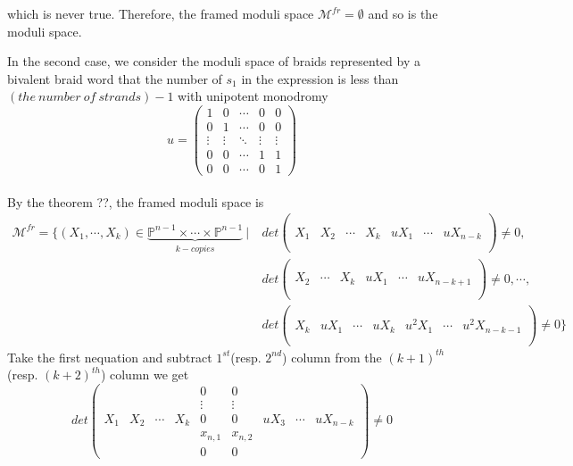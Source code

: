 \begin{example}
which is never true. Therefore, the framed moduli  space $\mathcal{M}^{fr}=\emptyset$ and so is the moduli space.\\
\bigskip

In the second case, we consider the moduli space of braids represented by a bivalent braid word that the number of  $s_1$ in the expression is less than $(the~number~of~strands)-1$ with unipotent monodromy 
\[u= 
\begin{pmatrix}
	1&0&\cdots&0&0\\
	0&1&\cdots&0&0\\
	\vdots&\vdots&\ddots&\vdots&\vdots\\
	0&0&\cdots&1&1\\
	0&0&\cdots&0&1
\end{pmatrix}
\] \\
By the theorem ??, the framed moduli space is 
		\begin{align*}
		\mathcal{M}^{fr}=
		\{(X_1,\cdots,X_{k}) \in 										\underbrace{\mathbb{P}^{n-1}\times \cdots \times \mathbb{P}			^{n-1}}_{k-copies}~|~		
		& det
		\left( \begin{array}{c|c|c|c|c|c|c}
			& & & & & &\\
			& & & & & &\\
			X_1&X_2&\cdots&X_{k}&uX_1&\cdots& uX_{n-k}\\
			& & & & & &\\
			& & & & & &
		\end{array}\right)
		\neq 0, \\
		& det
		\left( \begin{array}{c|c|c|c|c|c}
			& & & & &\\
			& & & & &\\
			X_2&\cdots&X_{k}&uX_1&\cdots& uX_{n-k+1}\\
			& & & & &\\
			& & & & &
		\end{array}\right)
		\neq 0,
		\cdots,\\
		& det
		\left( \begin{array}{c|c|c|c|c|c|c}
			& & & & & &\\
			& & & & & &\\
			X_k&uX_1&\cdots&uX_{k}&u^2 X_1&\cdots& u^2 X_{n-k-1}\\
			& & & & & &\\
			& & & & & &
		\end{array}\right)
		\neq 0
		\}
	\end{align*}
Take the first nequation and subtract $1^{st}$(resp. $2^{nd}$) column from the $(k+1)^{th}$(resp. $(k+2)^{th}$) column we get
\[
	det
		\left( \begin{array}{c|c|c|c|c|c|c|c|c}
		&   &   &      &0      & 0     & &    &                \\
		&   &   &      &\vdots &\vdots & &    &            \\
		X_1 &X_2&\cdots&X_{k}  &0      &0&uX_3&\cdots&uX_{n-k}\\
		&   &   &      &x_{n,1}&x_{n,2}& &    &            \\
		&   &   &      &0      &0      & &    &
		\end{array}\right)
		\neq 0
\]


\end{example}
